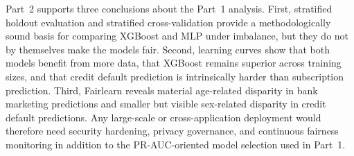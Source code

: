 Part~2 supports three conclusions about the Part~1 analysis. First, stratified
holdout evaluation and stratified cross-validation provide a methodologically
sound basis for comparing XGBoost and MLP under imbalance, but they do not by
themselves make the models fair. Second, learning curves show that both models
benefit from more data, that XGBoost remains superior across training sizes, and
that credit default prediction is intrinsically harder than subscription
prediction. Third, Fairlearn reveals material age-related disparity in bank
marketing predictions and smaller but visible sex-related disparity in credit
default predictions. Any large-scale or cross-application deployment would
therefore need security hardening, privacy governance, and continuous fairness
monitoring in addition to the PR-AUC-oriented model selection used in Part~1.
